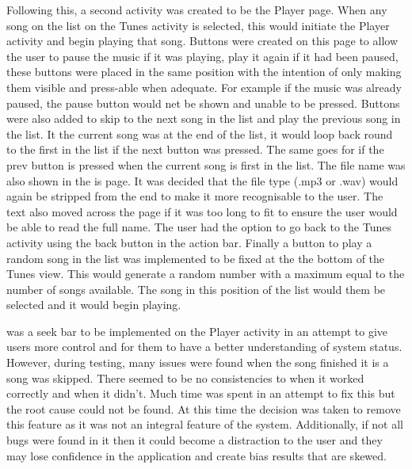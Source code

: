 \documentclass{l4proj}
\begin{document}
Following this, a second activity was created to be the Player page. When any song on the list on the Tunes activity is selected, this would initiate the Player activity and begin playing that song. Buttons were created on this page to allow the user to pause the music if it was playing, play it again if it had been paused, these buttons were placed in the same position with the intention of only making them visible and press-able when adequate. For example if the music was already paused, the pause button would net be shown and unable to be pressed. Buttons were also added to skip to the next song in the list and play the previous song in the list. It the current song was at the end of the list, it would loop back round to the first in the list if the next button was pressed. The same goes for if the prev button is pressed when the current song is first in the list. The file name was also shown in the is page. It was decided that the file type (.mp3 or .wav) would again be stripped from the end to make it more recognisable to the user. The text also moved across the page if it was too long to fit to ensure the user would be able to read the full name. The user had the option to go back to the Tunes activity using the back button in the action bar. Finally a button to play a random song in the list was implemented to be fixed at the the bottom of the Tunes view. This would generate a random number with a maximum equal to the number of songs available. The song in this position of the list would them be selected and it would begin playing. 

was a seek bar to be implemented on the Player activity in an attempt to give users more control and for them to have a better understanding of system status. However, during testing, many issues were found when the song finished it is a song was skipped. There seemed to be no consistencies to when it worked correctly and when it didn't. Much time was spent in an attempt to fix this but the root cause could not be found. At this time the decision was taken to remove this feature as it was not an integral feature of the system. Additionally, if not all bugs were found in it then it could become a distraction to the user and they may lose confidence in the application and create bias results that are skewed.
\end{document}
